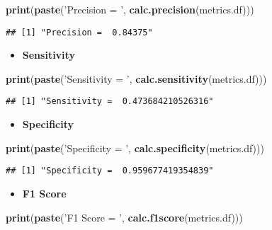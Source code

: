 \documentclass[]{article}
\newenvironment{Shaded}{\begin{snugshade}}{\end{snugshade}}
\newcommand{\KeywordTok}[1]{\textcolor[rgb]{0.13,0.29,0.53}{\textbf{#1}}}
\newcommand{\NormalTok}[1]{#1}
\newcommand{\StringTok}[1]{\textcolor[rgb]{0.31,0.60,0.02}{#1}}
\providecommand{\tightlist}{%
  \setlength{\itemsep}{0pt}\setlength{\parskip}{0pt}}
\begin{document}
\begin{Shaded}
\begin{Highlighting}[]
\KeywordTok{print}\NormalTok{(}\KeywordTok{paste}\NormalTok{(}\StringTok{'Precision = '}\NormalTok{, }\KeywordTok{calc.precision}\NormalTok{(metrics.df)))}
\end{Highlighting}
\end{Shaded}

\begin{verbatim}
## [1] "Precision =  0.84375"
\end{verbatim}

\begin{itemize}
\tightlist
\item
  \textbf{Sensitivity}
\end{itemize}

\begin{Shaded}
\begin{Highlighting}[]
\KeywordTok{print}\NormalTok{(}\KeywordTok{paste}\NormalTok{(}\StringTok{'Sensitivity = '}\NormalTok{, }\KeywordTok{calc.sensitivity}\NormalTok{(metrics.df)))}
\end{Highlighting}
\end{Shaded}

\begin{verbatim}
## [1] "Sensitivity =  0.473684210526316"
\end{verbatim}

\begin{itemize}
\tightlist
\item
  \textbf{Specificity}
\end{itemize}

\begin{Shaded}
\begin{Highlighting}[]
\KeywordTok{print}\NormalTok{(}\KeywordTok{paste}\NormalTok{(}\StringTok{'Specificity = '}\NormalTok{, }\KeywordTok{calc.specificity}\NormalTok{(metrics.df)))}
\end{Highlighting}
\end{Shaded}

\begin{verbatim}
## [1] "Specificity =  0.959677419354839"
\end{verbatim}

\begin{itemize}
\tightlist
\item
  \textbf{F1 Score}
\end{itemize}

\begin{Shaded}
\begin{Highlighting}[]
\KeywordTok{print}\NormalTok{(}\KeywordTok{paste}\NormalTok{(}\StringTok{'F1 Score = '}\NormalTok{, }\KeywordTok{calc.f1score}\NormalTok{(metrics.df)))}
\end{Highlighting}
\end{Shaded}
\end{document}
